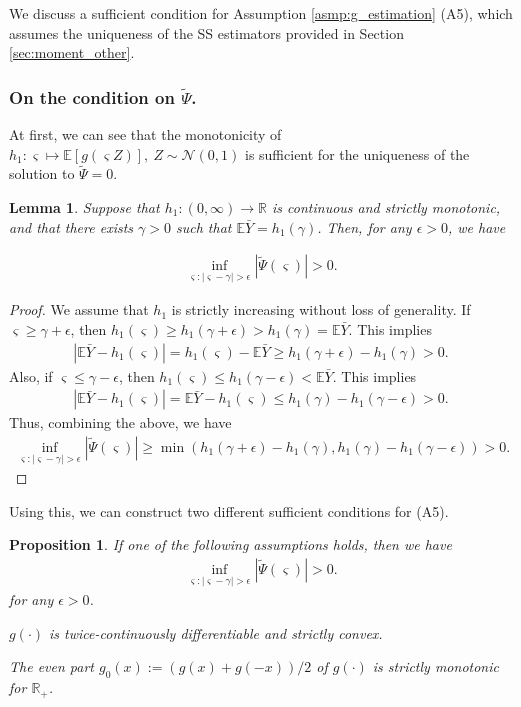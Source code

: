 \documentclass[12pt,reqno]{amsart}
\newtheorem{proposition}{Proposition}
\newtheorem{lemma}{Lemma}
\newcommand{\rbr}[1]{\left(#1\right)}
\newcommand{\R}{\mathbb{R}}
\newcommand{\E}{\mathbb{E}}
\newcommand{\bc}{\color{black}}
\newcommand{\cc}{\color{black}}
\begin{document}
We discuss a sufficient condition for Assumption \ref{asmp:g_estimation} (A5), which assumes the uniqueness of the SS estimators provided in Section \ref{sec:moment_other}.
{\cc
\subsubsection{On the condition on $\tilde\Psi$.}

At first, we can see that the monotonicity of $h_1:\varsigma\mapsto\E[g(\varsigma Z)],\ Z\sim\mathcal{N}(0,1)$ is sufficient for the uniqueness of the solution to $\tilde\Psi=0$.

\begin{lemma}
\label{lem:unique-by-monotone}
    Suppose that $h_1:(0,\infty)\to\R$ is continuous and strictly monotonic, and that there exists $\gamma>0$ such that $\E\bar Y=h_1(\gamma)$.
    Then, for any $\epsilon>0$, we have

    \begin{align}
        \inf_{\varsigma:|\varsigma-\gamma|>\epsilon}|\tilde\Psi(\varsigma)|>0.
    \end{align}
\end{lemma}
\begin{proof}
    We assume that $h_1$ is strictly increasing without loss of generality.
    If $\varsigma\ge\gamma+\epsilon$, then $h_1(\varsigma)\ge h_1(\gamma+\epsilon)>h_1(\gamma)=\E\bar Y$. 
    This implies 
    \begin{align}
        |\E\bar Y-h_1(\varsigma)|=h_1(\varsigma)-\E\bar Y\ge h_1(\gamma+\epsilon)-h_1(\gamma)>0.
    \end{align}
    Also, if $\varsigma\le\gamma-\epsilon$, then $h_1(\varsigma)\le h_1(\gamma-\epsilon)<\E\bar Y$. This implies
    \begin{align}
        |\E\bar Y-h_1(\varsigma)|=\E\bar Y-h_1(\varsigma)\le h_1(\gamma)-h_1(\gamma-\epsilon)>0.
    \end{align}
    Thus, combining the above, we have
    \begin{align}
        \inf_{\varsigma:|\varsigma-\gamma|>\epsilon}|\tilde\Psi(\varsigma)|
        \ge\min\rbr{h_1(\gamma+\epsilon)-h_1(\gamma),h_1(\gamma)-h_1(\gamma-\epsilon)}>0.
    \end{align}
\end{proof}

Using this, we can construct two different sufficient conditions for (A5).

\begin{proposition}
\label{asmp:asymmetric}
If one of the following assumptions holds, then we have 
\begin{align}
    \inf_{\varsigma:|\varsigma-\gamma|>\epsilon}|\tilde\Psi(\varsigma)|>0.
\end{align}
for any $\epsilon>0$.
\begin{enumerate}
    \item[(i)] $g(\cdot)$ is twice-continuously differentiable and strictly convex. 
    {\bc\item[(ii)] The even part $g_0(x):=(g(x)+g(-x))/2$ of $g(\cdot)$ is strictly monotonic for $\R_+$.}
\end{enumerate} 
\end{proposition}

}
\end{document}
